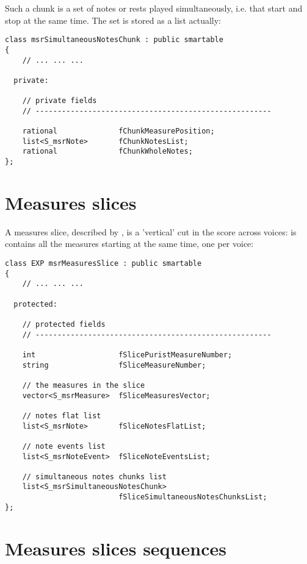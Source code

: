 Such a chunk is a set of notes or rests played simultaneously, i.e. that start and stop at the same time. The set is stored as a list actually:
\begin{lstlisting}[language=CPlusPlus]
class msrSimultaneousNotesChunk : public smartable
{
	// ... ... ...

  private:

    // private fields
    // ------------------------------------------------------

    rational              fChunkMeasurePosition;
    list<S_msrNote>       fChunkNotesList;
    rational              fChunkWholeNotes;
};
\end{lstlisting}


\section{Measures slices}

A measures slice, described by , is a 'vertical' cut in the score across voices: is contains all the measures starting at the same time, one per voice:
\begin{lstlisting}[language=CPlusPlus]
class EXP msrMeasuresSlice : public smartable
{
	// ... ... ...

  protected:

    // protected fields
    // ------------------------------------------------------

    int                   fSlicePuristMeasureNumber;
    string                fSliceMeasureNumber;

    // the measures in the slice
    vector<S_msrMeasure>  fSliceMeasuresVector;

    // notes flat list
    list<S_msrNote>       fSliceNotesFlatList;

    // note events list
    list<S_msrNoteEvent>  fSliceNoteEventsList;

    // simultaneous notes chunks list
    list<S_msrSimultaneousNotesChunk>
                          fSliceSimultaneousNotesChunksList;
};

\end{lstlisting}


\section{Measures slices sequences}

